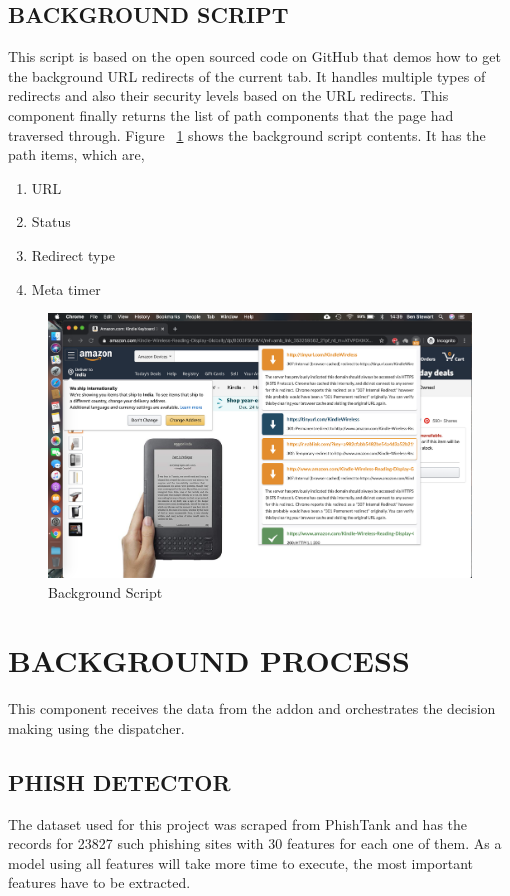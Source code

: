 \subsection{BACKGROUND SCRIPT}
This script is based on the open sourced code on GitHub that demos how to get the background URL redirects of the current tab. It handles multiple types of redirects and also their security levels based on the URL redirects. This component finally returns the list of path components that the page had traversed through. Figure ~\ref{fig:bgscript} shows the background script contents. It has the path items, which are,


\begin{enumerate}
    \item URL
    \item Status
    \item Redirect type
    \item Meta timer
 \end{enumerate}

\begin{figure}[htp]
\centering
\includegraphics[scale=0.15]{Figures/image5.png}
\caption{Background Script}
\label{fig:bgscript}
\end{figure}

\section{BACKGROUND PROCESS}
This component receives the data from the addon and orchestrates the decision making using the dispatcher.

\subsection{PHISH DETECTOR}
The dataset used for this project was scraped from PhishTank and has the records for 23827 such phishing sites with 30 features for each one of them. As a model using all features will take more time to execute, the most important features have to be extracted.

